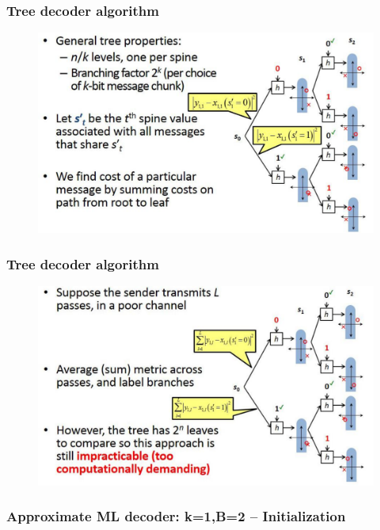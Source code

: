 \documentclass{beamer}
\begin{document}
\begin{frame}
\frametitle{Tree decoder algorithm}
\begin{figure}
\includegraphics[width=.99\textwidth]{Spinaldecode3.pdf}
\end{figure}
\end{frame}
\begin{frame}
\frametitle{Tree decoder algorithm}
\begin{figure}
\includegraphics[width=.99\textwidth]{Spinaldecode4.pdf}
\end{figure}
\end{frame}
\begin{frame}
\frametitle{Approximate ML decoder: k=1,B=2 -- Initialization}

\end{frame}
\end{document}
